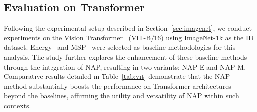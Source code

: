 \subsection{Evaluation on Transformer}
Following the experimental setup described in Section~\ref{sec:imagenet}, we conduct experiments on the Vision Transformer~\cite{dosovitskiy2020image} (ViT-B/16) using ImageNet-1k as the ID dataset. Energy~\cite{liu2020energy} and MSP~\cite{hendrycks2016msp} were selected as baseline methodologies for this analysis. The study further explores the enhancement of these baseline methods through the integration of NAP, resulting in two variants: NAP-E and NAP-M. Comparative results detailed in Table~\ref{tab:vit} demonstrate that the NAP method substantially boosts the performance on Transformer architectures beyond the baselines, affirming the utility and versatility of NAP within such contexts.
